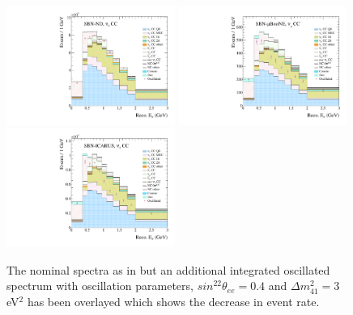 \begin{figure}[h!]
  {\includegraphics[width=0.49\textwidth]{figures-chap6/spectra/nue_disapp_dmsq_3_sinsq_0.4_overlay_spectrum_sbn_nd_BNB_FHC_0_modes.pdf}}
  {\includegraphics[width=0.49\textwidth]{figures-chap6/spectra/nue_disapp_dmsq_3_sinsq_0.4_overlay_spectrum_sbn_uboone_BNB_FHC_1_modes.pdf}}
  {\includegraphics[width=0.49\textwidth]{figures-chap6/spectra/nue_disapp_dmsq_3_sinsq_0.4_overlay_spectrum_sbn_icarus_BNB_FHC_2_modes.pdf}}
  \captionsetup{width=0.49\textwidth}
  \parbox[b]{0.49\textwidth}%
  {
    \caption[SBN \nue disappearance CC inclusive reconstructed neutrino energy spectra with oscillated spectrum overlayed]{The nominal spectra as in  but an additional integrated oscillated spectrum with oscillation parameters, $sin^22\theta_{ee} = 0.4$ and $\Delta m^2_{41} = 3$ eV$^2$ has been overlayed which shows the decrease in event rate.\\\\\\}
    \label{fig:nue_disapp_spectra} 
  }
\end{figure}

